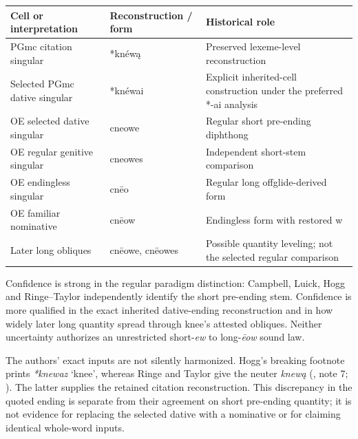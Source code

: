 \documentclass[
  british,
  a4paper,
]{article}
\newcounter{none} %
\providecommand{\Recon}[1]{\emph{*#1}}
\begin{document}
{\def\LTcaptype{none} %
\begin{longtable}[]{@{}
  >{\raggedright\arraybackslash}p{}
  >{\raggedright\arraybackslash}p{}
  >{\raggedright\arraybackslash}p{}@{}}
\toprule\noalign{}
\begin{minipage}[b]{\linewidth}\raggedright
Cell or interpretation
\end{minipage} & \begin{minipage}[b]{\linewidth}\raggedright
Reconstruction / form
\end{minipage} & \begin{minipage}[b]{\linewidth}\raggedright
Historical role
\end{minipage} \\
\midrule\noalign{}
\endhead
\bottomrule\noalign{}
\endlastfoot
PGmc citation singular & *knéwą & Preserved lexeme-level
reconstruction \\
Selected PGmc dative singular & *knéwai & Explicit inherited-cell
construction under the preferred *-ai analysis \\
OE selected dative singular & cneowe & Regular short pre-ending
diphthong \\
OE regular genitive singular & cneowes & Independent short-stem
comparison \\
OE endingless singular & cnēo & Regular long offglide-derived form \\
OE familiar nominative & cnēow & Endingless form with restored w \\
Later long obliques & cnēowe, cnēowes & Possible quantity leveling; not
the selected regular comparison \\
\end{longtable}
}

Confidence is strong in the regular paradigm distinction: Campbell,
Luick, Hogg and Ringe--Taylor independently identify the short
pre-ending stem. Confidence is more qualified in the exact inherited
dative-ending reconstruction and in how widely later long quantity
spread through knee's attested obliques. Neither uncertainty authorizes
an unrestricted short-\emph{ew} to long-\emph{ēow} sound law.

The authors' exact inputs are not silently harmonized. Hogg's breaking
footnote prints \Recon{knewaz} `knee', whereas Ringe and Taylor give the
neuter \emph{knewą} (, note
7; ). The
latter supplies the retained citation reconstruction. This discrepancy
in the quoted ending is separate from their agreement on short
pre-ending quantity; it is not evidence for replacing the selected
dative with a nominative or for claiming identical whole-word inputs.
\end{document}
